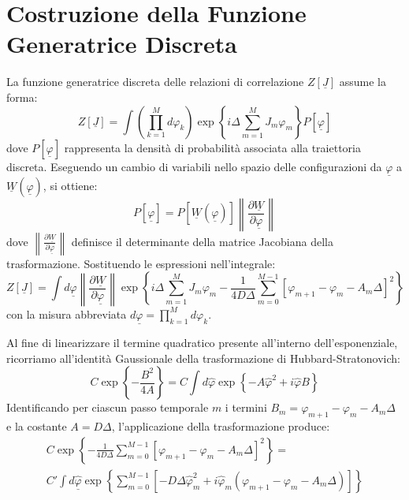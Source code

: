 \section{Costruzione della Funzione Generatrice Discreta}
La funzione generatrice discreta delle relazioni di correlazione $Z[\underline{J}]$ assume la forma:
\begin{equation}
Z[\underline{J}] = \int \left(\prod_{k=1}^{M} d\varphi_k\right) \exp\left\{ i\Delta \sum_{m=1}^{M} J_m \varphi_m \right\} P[\underline{\varphi}]
\end{equation}
dove $P[\underline{\varphi}]$ rappresenta la densità di probabilità associata alla traiettoria discreta. Eseguendo un cambio di variabili nello spazio delle configurazioni da $\underline{\varphi}$ a $\underline{W}(\underline{\varphi})$, si ottiene:
\begin{equation}
P[\underline{\varphi}] = P[\underline{W}(\underline{\varphi})] \left\| \frac{\partial \underline{W}}{\partial \underline{\varphi}} \right\|
\end{equation}
dove $\left\| \frac{\partial \underline{W}}{\partial \underline{\varphi}} \right\|$ definisce il determinante della matrice Jacobiana della trasformazione. Sostituendo le espressioni nell'integrale:
\begin{equation*}
Z[\underline{J}] = \int d\underline{\varphi} \left\| \frac{\partial \underline{W}}{\partial \underline{\varphi}} \right\| \exp\left\{ i\Delta \sum_{m=1}^{M} J_m \varphi_m - \frac{1}{4D\Delta} \sum_{m=0}^{M-1} [\varphi_{m+1}-\varphi_m-A_m\Delta]^2 \right\}
\end{equation*}
con la misura abbreviata $d\underline{\varphi} = \prod_{k=1}^{M} d\varphi_k$.

Al fine di linearizzare il termine quadratico presente all'interno dell'esponenziale, ricorriamo all'identità Gaussionale della trasformazione di Hubbard-Stratonovich:
\begin{equation}
C \exp\left\{ -\frac{B^2}{4A} \right\} = C \int d\hat{\varphi} \exp\left\{ -A\hat{\varphi}^2 + i\hat{\varphi}B \right\}
\end{equation}
Identificando per ciascun passo temporale $m$ i termini $B_m = \varphi_{m+1}-\varphi_m-A_m\Delta$ e la costante $A = D\Delta$, l'applicazione della trasformazione produce:
\begin{align}
C\exp\left\{ -\frac{1}{4D\Delta} \sum_{m=0}^{M-1} [\varphi_{m+1}-\varphi_m-A_m\Delta]^2 \right\} = \nonumber \\
C' \int d\underline{\hat{\varphi}} \exp\left\{ \sum_{m=0}^{M-1} \left[ -D\Delta\hat{\varphi}_m^2 + i\hat{\varphi}_m(\varphi_{m+1}-\varphi_m-A_m\Delta) \right] \right\}
\end{align}

